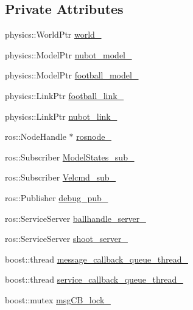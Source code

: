 \subsection*{Private Attributes}
\begin{DoxyCompactItemize}
\item 
physics\-::\-World\-Ptr \hyperlink{classgazebo_1_1NubotGazebo_aa56e5c10cfbbc981460ab1bcc204d071}{world\-\_\-}
\item 
physics\-::\-Model\-Ptr \hyperlink{classgazebo_1_1NubotGazebo_ac7f22b4b498327d11697f07cb064e460}{nubot\-\_\-model\-\_\-}
\item 
physics\-::\-Model\-Ptr \hyperlink{classgazebo_1_1NubotGazebo_a76897836db2bb2e49c75fbf64b4b9aeb}{football\-\_\-model\-\_\-}
\item 
physics\-::\-Link\-Ptr \hyperlink{classgazebo_1_1NubotGazebo_a191e11ef5a0b3e6275c3938ad61cec0a}{football\-\_\-link\-\_\-}
\item 
physics\-::\-Link\-Ptr \hyperlink{classgazebo_1_1NubotGazebo_a97a021a147d45134fe79ab21531e55df}{nubot\-\_\-link\-\_\-}
\item 
ros\-::\-Node\-Handle $\ast$ \hyperlink{classgazebo_1_1NubotGazebo_a310c7df239fab0570dbdc82d4552ec6d}{rosnode\-\_\-}
\item 
ros\-::\-Subscriber \hyperlink{classgazebo_1_1NubotGazebo_a7b758780795b0406d06bf5db5122dbe2}{Model\-States\-\_\-sub\-\_\-}
\item 
ros\-::\-Subscriber \hyperlink{classgazebo_1_1NubotGazebo_a6264896320559e214ac33d820c44b357}{Velcmd\-\_\-sub\-\_\-}
\item 
ros\-::\-Publisher \hyperlink{classgazebo_1_1NubotGazebo_ab150ae2392ec6946dd48b595f4508395}{debug\-\_\-pub\-\_\-}
\item 
ros\-::\-Service\-Server \hyperlink{classgazebo_1_1NubotGazebo_af8abc682c8dc7cad7d29d131901aec05}{ballhandle\-\_\-server\-\_\-}
\item 
ros\-::\-Service\-Server \hyperlink{classgazebo_1_1NubotGazebo_afd3e6ab82580823e83d84433dac19e86}{shoot\-\_\-server\-\_\-}
\item 
boost\-::thread \hyperlink{classgazebo_1_1NubotGazebo_ae985620428222dd9b1b5f507339119b8}{message\-\_\-callback\-\_\-queue\-\_\-thread\-\_\-}
\item 
boost\-::thread \hyperlink{classgazebo_1_1NubotGazebo_a0c0bc3e99d501d7fcac319848006f87c}{service\-\_\-callback\-\_\-queue\-\_\-thread\-\_\-}
\item 
boost\-::mutex \hyperlink{classgazebo_1_1NubotGazebo_a70f7775e1670311efc2aad7c306a3077}{msg\-C\-B\-\_\-lock\-\_\-}

\end{DoxyCompactItemize}
